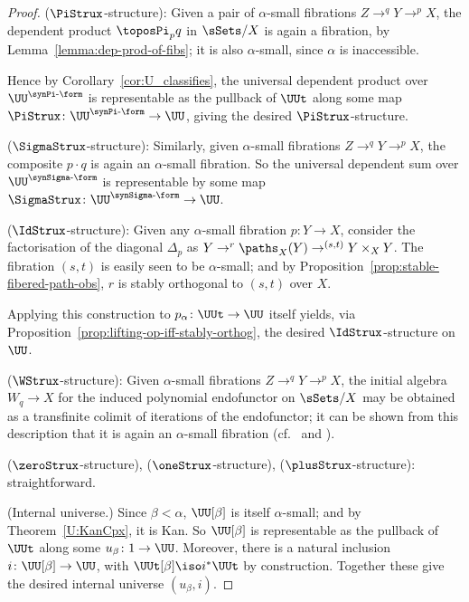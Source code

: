 \begin{proof}
($\PiStrux$-structure): Given a pair of $\alpha$-small fibrations $Z \to^q Y \to^p X$, the dependent product $\toposPi_p q$ in $\sSets/X$ is again a fibration, by Lemma~\ref{lemma:dep-prod-of-fibs}; it is also $\alpha$-small, since $\alpha$ is inaccessible.

Hence by Corollary~\ref{cor:U_classifies}, the universal dependent product over $\UU^{\synPi\text{-\form}}$ is representable as the pullback of $\UUt$ along some map $\PiStrux \colon \UU^{\synPi\text{-\form}} \to \UU$, giving the desired $\PiStrux$-structure.

($\SigmaStrux$-structure): Similarly, given $\alpha$-small fibrations $Z \to^q Y \to^p X$, the composite $p \cdot q$ is again an $\alpha$-small fibration.  So the universal dependent sum over $\UU^{\synSigma\text{-\form}}$ is representable by some map $\SigmaStrux \colon \UU^{\synSigma\text{-\form}} \to \UU$.

($\IdStrux$-structure): Given any $\alpha$-small fibration $p \colon Y \to X$, consider the factorisation of the diagonal $\Delta_p$ as $Y \to^{r} \paths_X(Y) \to^{(s,t)} Y \times_X Y$.  The fibration $(s,t)$ is easily seen to be $\alpha$-small; and by Proposition~\ref{prop:stable-fibered-path-obs}, $r$ is stably orthogonal to $(s,t)$ over $X$.

Applying this construction to $p_\alpha \colon \UUt \to \UU$ itself yields, via Proposition~\ref{prop:lifting-op-iff-stably-orthog}, the desired $\IdStrux$-structure on $\UU$.

($\WStrux$-structure): Given $\alpha$-small fibrations $Z \to^q Y \to^p X$, the initial algebra $W_q \to X$ for the induced polynomial endofunctor on $\sSets/X$ may be obtained as a transfinite colimit of iterations of the endofunctor; it can be shown from this description that it is again an $\alpha$-small fibration (cf.~\cite[Thm.~3.4]{moerdijk-van-den-berg:w-types-in-hott} and \cite{moerdijk-van-den-berg:w-types-in-hott-corr}).

($\zeroStrux$-structure), ($\oneStrux$-structure), ($\plusStrux$-structure): straightforward.

(Internal universe.)  Since $\beta < \alpha$, $\UU[\beta]$ is itself $\alpha$-small; and by Theorem~\ref{U:KanCpx}, it is Kan.  So $\UU[\beta]$ is representable as the pullback of $\UUt$ along some $u_\beta \colon 1 \to \UU$.  Moreover, there is a natural inclusion $i \colon \UU[\beta] \to \UU$, with $\UUt[\beta] \iso i^* \UUt$ by construction.  Together these give the desired internal universe $(u_\beta, i)$.


\end{proof}
